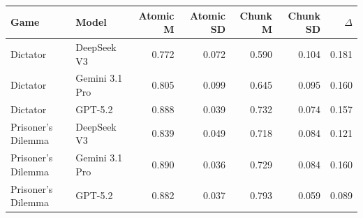 \begin{center}
\normalsize
\setlength{\tabcolsep}{3pt}
\begin{tabular}{@{}llrrrrr@{}}
\toprule
Game & Model & Atomic M & Atomic SD & Chunk M & Chunk SD & $\Delta$ \\
\midrule
Dictator & DeepSeek V3 & 0.772 & 0.072 & 0.590 & 0.104 & 0.181 \\
Dictator & Gemini 3.1 Pro & 0.805 & 0.099 & 0.645 & 0.095 & 0.160 \\
Dictator & GPT-5.2 & 0.888 & 0.039 & 0.732 & 0.074 & 0.157 \\
Prisoner's Dilemma & DeepSeek V3 & 0.839 & 0.049 & 0.718 & 0.084 & 0.121 \\
Prisoner's Dilemma & Gemini 3.1 Pro & 0.890 & 0.036 & 0.729 & 0.084 & 0.160 \\
Prisoner's Dilemma & GPT-5.2 & 0.882 & 0.037 & 0.793 & 0.059 & 0.089 \\
\bottomrule
\end{tabular}
\end{center}
